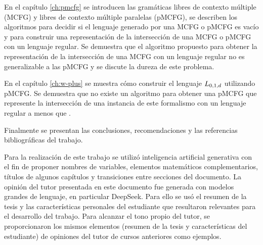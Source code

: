 En el capítulo \ref{ch:pmcfg} se introducen las gramáticas libres de contexto múltiple (MCFG) y libres de contexto múltiple paralelas (pMCFG), se describen los algoritmos para decidir si el lenguaje generado por una MCFG o pMCFG es vacío y para construir una representación de la intersección de una MCFG o pMCFG con un lenguaje regular. Se demuestra que el algoritmo propuesto para obtener la representación de la intersección de una MCFG con un lenguaje regular no es generalizable a las pMCFG y se discute la dureza de este problema.

En el capítulo \ref{ch:w-plus} se muestra cómo construir el lenguaje $L_{0,1,d}$ utilizando pMCFG. Se demuestra que no existe un algoritmo para obtener una pMCFG que represente la intersección de una instancia de este formalismo con un lenguaje regular a menos que \pnp.

Finalmente se presentan las conclusiones, recomendaciones y las referencias bibliográficas del trabajo.

Para la realización de este trabajo se utilizó inteligencia artificial generativa con el fin de proponer nombres de variables, elementos matemáticos complementarios, títulos de algunos capítulos y transiciones entre secciones del documento. La opinión del tutor presentada en este documento fue generada con modelos grandes de lenguaje, en particular DeepSeek. Para ello se usó el resumen de la tesis y las características personales del estudiante que resultaron relevantes para el desarrollo del trabajo. Para alcanzar el tono propio del tutor, se proporcionaron los mismos elementos (resumen de la tesis y características del estudiante) de opiniones del tutor de cursos anteriores como ejemplos.